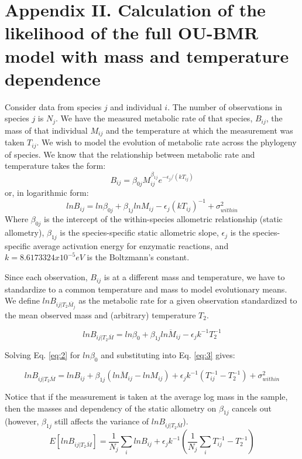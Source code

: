 \documentclass[a4paper,11pt]{article}
\begin{document}
\section*{Appendix II. Calculation of the likelihood of the full OU-BMR model with mass and temperature dependence}
%
Consider data from species $j$ and individual $i$. The number of observations in species $j$ is $N_j$. We have the measured metabolic rate of that species, $B_{ij}$, the mass of that individual $M_{ij}$ and the temperature at which the measurement was taken $T_{ij}$. We wish to model the evolution of metabolic rate across the phylogeny of species. We know that the relationship between metabolic rate and temperature takes the form:
\begin{equation}
B_{ij} = \beta_{0j}M_{ij}^{\beta_{1j}}e^{-\epsilon_j/(kT_{ij})}
\end{equation}
or, in logarithmic form:
\begin{equation}\label{eq:2}
ln B_{ij} = ln\beta_{0j} + \beta_{1j}lnM_{ij} - \epsilon_j(kT_{ij})^{-1} + \sigma^2_{within}
\end{equation}
Where $\beta_{0j}$ is the intercept of the within-species allometric relationship (static allometry), $\beta_{1j}$ is the species-specific static allometric slope, $\epsilon_j$ is the species-specific average activation energy for enzymatic reactions, and $k = 8.6173324 x 10^{-5} eV$ is the Boltzmann's constant. 

Since each observation, $B_{ij}$ is at a different mass and temperature, we have to standardize to a common temperature and mass to model evolutionary means. We define $ln B_{ij|T_2\overline{M_j}}$ as the metabolic rate for a given observation standardized to the mean observed mass and (arbitrary) temperature $T_2$.

\begin{equation}\label{eq:3}
lnB_{ij|T_2\overline{M}} = ln\beta_0 + \beta_{1j}\overline{lnM_{ij}} - \epsilon_jk^{-1} T_2^{-1}
\end{equation}

Solving Eq. \ref{eq:2} for $ln\beta_0$ and substituting into Eq. \ref{eq:3} gives:

\begin{equation}\label{eq:4}
lnB_{ij|T_2\overline{M}} = lnB_{ij} + \beta_{1j}(\overline{lnM_{ij}} - lnM_{ij}) + \epsilon_jk^{-1} (T_{ij}^{-1} - T_2^{-1}) + \sigma^2_{within}
\end{equation}

Notice that if the measurement is taken at the average log mass in the sample, then the masses and dependency of the static allometry on $\beta_{1j}$ cancels out (however, $\beta_{1j}$ still affects the variance of $lnB_{ij|T_2\overline{M}}$).
\begin{equation}\label{eq:5}
E[lnB_{ij|T_2\overline{M}}] = \frac{1}{N_j}\sum_ilnB_{ij} + \epsilon_jk^{-1}(\frac{1}{N_j}\sum_iT_{ij}^{-1}-T_2^{-1})
\end{equation}
\end{document}
